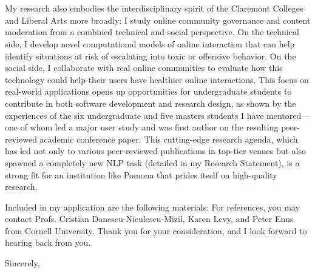 \documentclass[12pt]{letter}
\begin{document}
\begin{letter}{
\department \\
\schoolnamelong \\
\schooladdress
}
My research also embodies the interdisciplinary spirit of the Claremont Colleges and Liberal Arts more broadly: I study online community governance and content moderation from a combined technical and social perspective.
On the technical side, I develop novel computational models of online interaction that can help identify situations at risk of escalating into toxic or offensive behavior.
On the social side, I collaborate with real online communities to evaluate how this technology could help their users have healthier online interactions.
This focus on real-world applications opens up opportunities for undergraduate students to contribute in both software development and research design, as shown by the experiences of the six undergraduate and five masters students I have mentored---one of whom led a major user study and was first author on the resulting peer-reviewed academic conference paper.
This cutting-edge research agenda, which has led not only to various peer-reviewed publications in top-tier venues but also spawned a completely new NLP task (detailed in my Research Statement), is a strong fit for an institution like Pomona that prides itself on high-quality research.

Included in my application are the following materials: \materials
For references, you may contact Profs. Cristian Danescu-Niculescu-Mizil, Karen Levy, and Peter Enns from Cornell University.
Thank you for your consideration, and I look forward to hearing back from you.

\closing{Sincerely,}

\end{letter}
\end{document}
